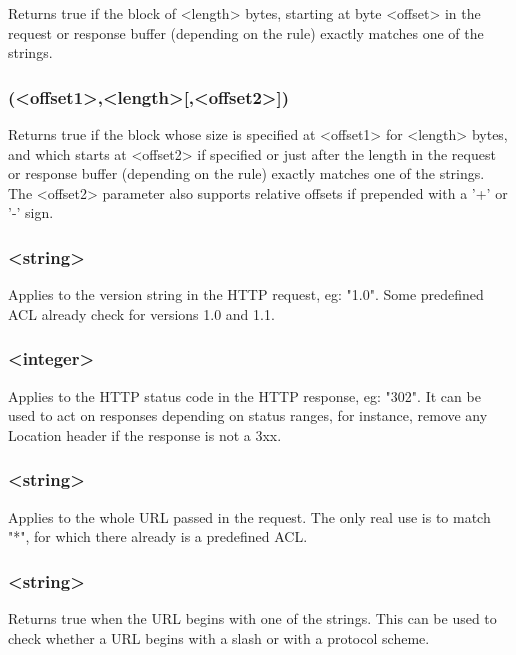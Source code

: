   Returns true if the block of <length> bytes, starting at byte <offset> in the
  request or response buffer (depending on the rule) exactly matches one of the
  strings.

\subsubsection[payload\_lv]{(<offset1>,<length>[,<offset2>])}

  Returns true if the block whose size is specified at <offset1> for <length>
  bytes, and which starts at <offset2> if specified or just after the length in
  the request or response buffer (depending on the rule) exactly matches one of
  the strings. The <offset2> parameter also supports relative offsets if
  prepended with a '+' or '-' sign.

\subsubsection[req\_ver]{ <string>}

  Applies to the version string in the HTTP request, eg: "1.0". Some predefined
  ACL already check for versions 1.0 and 1.1.

\subsubsection[status]{ <integer>}

  Applies to the HTTP status code in the HTTP response, eg: "302". It can be
  used to act on responses depending on status ranges, for instance, remove
  any Location header if the response is not a 3xx.

\subsubsection[url]{ <string>}

  Applies to the whole URL passed in the request. The only real use is to match
  "*", for which there already is a predefined ACL.

\subsubsection[url\_beg]{ <string>}

  Returns true when the URL begins with one of the strings. This can be used to
  check whether a URL begins with a slash or with a protocol scheme.

